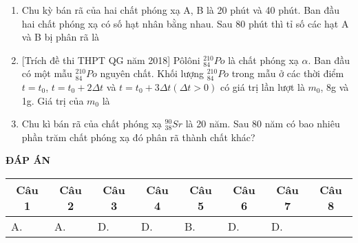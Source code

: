 \begin{enumerate}
{		
	}
	\item {Chu kỳ bán rã của hai chất phóng xạ A, B là 20 phút và 40 phút. Ban đầu hai chất phóng xạ có số hạt nhân bằng nhau. Sau 80 phút thì tỉ số các hạt A và B bị phân rã là
	}
	\item{[Trích đề thi THPT QG năm 2018] Pôlôni $^{210}_{84} Po$ là chất phóng xạ $\alpha$. Ban đầu có một mẫu $^{210}_{84}Po$  nguyên chất. Khối lượng $^{210}_{84}Po$ trong mẫu ở các thời điểm $t=t_0$, $t=t_0 +2\Delta t$ và $t=t_0 +3\Delta t (\Delta t>0)$ có giá trị lần lượt là $m_0$, 8g và 1g. Giá trị của $m_0$ là
	}
	\item{Chu kì bán rã của chất phóng xạ $^{90}_{38}Sr$ là 20 năm. Sau 80 năm có bao nhiêu phần trăm chất phóng xạ đó phân rã thành chất khác?
	}
\end{enumerate}

\textbf{ĐÁP ÁN}
\begin{longtable}[\textwidth]{|p{}|p{}|p{}|p{}|p{}|p{}|p{}|p{}|}
	\hline%
	\multicolumn{1}{|c|}{\textbf{Câu 1}} & \multicolumn{1}{c|}{\textbf{Câu 2}} & \multicolumn{1}{c|}{\textbf{Câu 3}} &
	\multicolumn{1}{c|}{\textbf{Câu 4}} &
	\multicolumn{1}{c|}{\textbf{Câu 5}} &
	\multicolumn{1}{c|}{\textbf{Câu 6}} &
	\multicolumn{1}{c|}{\textbf{Câu 7}} &
	\multicolumn{1}{c|}{\textbf{Câu 8}} \\
	\hline
	A.&A. &D. &D. &B. &D. &D. &	\\
	\hline
	
\end{longtable} 

